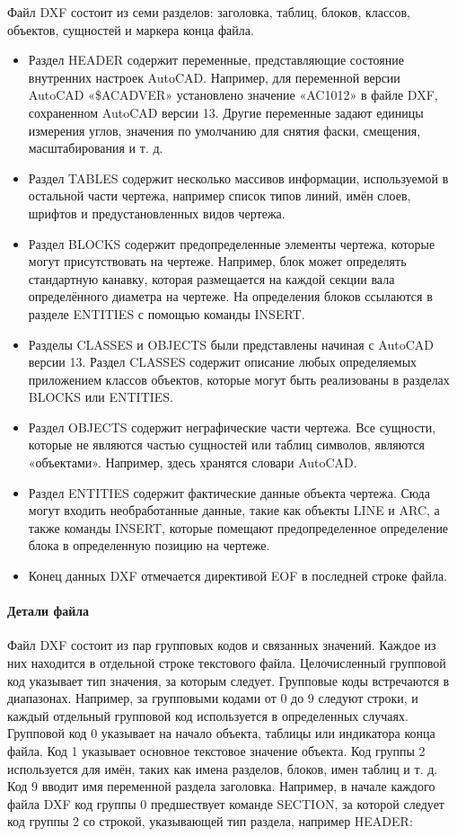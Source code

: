 Файл DXF состоит из семи разделов: заголовка, таблиц, блоков, классов, объектов, сущностей и маркера конца файла.

\begin{itemize}
	\item Раздел HEADER содержит переменные, представляющие состояние внутренних настроек AutoCAD. Например, для переменной версии AutoCAD «\$ACADVER» установлено значение «AC1012» в файле DXF, сохраненном AutoCAD версии 13. Другие переменные задают единицы измерения углов, значения по умолчанию для снятия фаски, смещения, масштабирования и т. д.
	\item Раздел TABLES содержит несколько массивов информации, используемой в остальной части чертежа, например список типов линий, имён слоев, шрифтов и предустановленных видов чертежа.
	\item Раздел BLOCKS содержит предопределенные элементы чертежа, которые могут присутствовать на чертеже. Например, блок может определять стандартную канавку, которая размещается на каждой секции вала определённого диаметра на чертеже. На определения блоков ссылаются в разделе ENTITIES с помощью команды INSERT.
	\item Разделы CLASSES и OBJECTS были представлены начиная с AutoCAD версии 13. Раздел CLASSES содержит описание любых определяемых приложением классов объектов, которые могут быть реализованы в разделах BLOCKS или ENTITIES.
	\item Раздел OBJECTS содержит неграфические части чертежа. Все сущности, которые не являются частью сущностей или таблиц символов, являются «объектами». Например, здесь хранятся словари AutoCAD.
	\item Раздел ENTITIES содержит фактические данные объекта чертежа. Сюда могут входить необработанные данные, такие как объекты LINE и ARC, а также команды INSERT, которые помещают предопределенное определение блока в определенную позицию на чертеже.
	\item Конец данных DXF отмечается директивой EOF в последней строке файла.
\end{itemize}

\paragraph{Детали файла}
Файл DXF состоит из пар групповых кодов и связанных значений. Каждое из них находится в отдельной строке текстового файла. Целочисленный групповой код указывает тип значения, за которым следует. Групповые коды встречаются в диапазонах. Например, за групповыми кодами от 0 до 9 следуют строки, и каждый отдельный групповой код используется в определенных случаях. Групповой код 0 указывает на начало объекта, таблицы или индикатора конца файла. Код 1 указывает основное текстовое значение объекта. Код группы 2 используется для имён, таких как имена разделов, блоков, имен таблиц и т. д. Код 9 вводит имя переменной раздела заголовка. Например, в начале каждого файла DXF код группы 0 предшествует команде SECTION, за которой следует код группы 2 со строкой, указывающей тип раздела, например HEADER:

